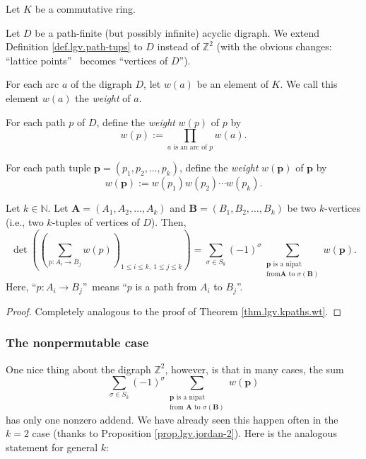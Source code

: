 \begin{theorem}
\label{thm.lgv.kpaths.wt-dg}Let $K$ be a
commutative ring.

Let $D$ be a path-finite (but possibly infinite) acyclic digraph. We extend
Definition \ref{def.lgv.path-tups} to $D$ instead of $\mathbb{Z}^{2}$ (with
the obvious changes: \textquotedblleft lattice points\textquotedblright%
\ becomes \textquotedblleft vertices of $D$\textquotedblright).

For each arc $a$ of the digraph $D$, let $w\left(  a\right)  $ be an element
of $K$. We call this element $w\left(  a\right)  $ the \emph{weight} of $a$.

For each path $p$ of $D$, define the \emph{weight} $w\left(  p\right)  $ of
$p$ by%
\[
w\left(  p\right)  :=\prod_{a\text{ is an arc of }p}w\left(  a\right)  .
\]


For each path tuple $\mathbf{p}=\left(  p_{1},p_{2},\ldots,p_{k}\right)  $,
define the \emph{weight} $w\left(  \mathbf{p}\right)  $ of $\mathbf{p}$ by%
\[
w\left(  \mathbf{p}\right)  :=w\left(  p_{1}\right)  w\left(  p_{2}\right)
\cdots w\left(  p_{k}\right)  .
\]


Let $k\in\mathbb{N}$. Let $\mathbf{A}=\left(  A_{1},A_{2},\ldots,A_{k}\right)
$ and $\mathbf{B}=\left(  B_{1},B_{2},\ldots,B_{k}\right)  $ be two
$k$-vertices (i.e., two $k$-tuples of vertices of $D$). Then,%
\[
\det\left(  \left(  \sum_{p:A_{i}\rightarrow B_{j}}w\left(  p\right)  \right)
_{1\leq i\leq k,\ 1\leq j\leq k}\right)  =\sum_{\sigma\in S_{k}}\left(
-1\right)  ^{\sigma}\sum_{\substack{\mathbf{p}\text{ is a nipat}\\\text{from
}\mathbf{A}\text{ to }\sigma\left(  \mathbf{B}\right)  }}w\left(
\mathbf{p}\right)  .
\]
Here, \textquotedblleft$p:A_{i}\rightarrow B_{j}$\textquotedblright\ means
\textquotedblleft$p$ is a path from $A_{i}$ to $B_{j}$\textquotedblright.
\end{theorem}

\begin{proof}
Completely analogous to the proof of Theorem \ref{thm.lgv.kpaths.wt}.
\end{proof}

\subsubsection{The nonpermutable case}

One nice thing about the digraph $\mathbb{Z}^{2}$, however, is that in many
cases, the sum%
\[
\sum_{\sigma\in S_{k}}\left(  -1\right)  ^{\sigma}\sum_{\substack{\mathbf{p}%
\text{ is a nipat}\\\text{from }\mathbf{A}\text{ to }\sigma\left(
\mathbf{B}\right)  }}w\left(  \mathbf{p}\right)
\]
has only one nonzero addend. We have already seen this happen often in the
$k=2$ case (thanks to Proposition \ref{prop.lgv.jordan-2}). Here is the
analogous statement for general $k$:

